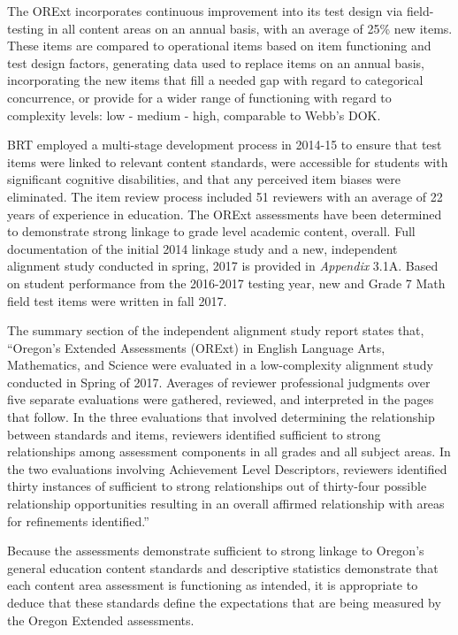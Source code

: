\documentclass[]{article}
\begin{document}
The ORExt incorporates continuous improvement into its test design via
field-testing in all content areas on an annual basis, with an average
of 25\% new items. These items are compared to operational items based
on item functioning and test design factors, generating data used to
replace items on an annual basis, incorporating the new items that fill
a needed gap with regard to categorical concurrence, or provide for a
wider range of functioning with regard to complexity levels: low -
medium - high, comparable to Webb's DOK.

BRT employed a multi-stage development process in 2014-15 to ensure that
test items were linked to relevant content standards, were accessible
for students with significant cognitive disabilities, and that any
perceived item biases were eliminated. The item review process included
51 reviewers with an average of 22 years of experience in education. The
ORExt assessments have been determined to demonstrate strong linkage to
grade level academic content, overall. Full documentation of the initial
2014 linkage study and a new, independent alignment study conducted in
spring, 2017 is provided in \emph{Appendix} 3.1A. Based on student
performance from the 2016-2017 testing year, new and Grade 7 Math field
test items were written in fall 2017.

The summary section of the independent alignment study report states
that, ``Oregon's Extended Assessments (ORExt) in English Language Arts,
Mathematics, and Science were evaluated in a low-complexity alignment
study conducted in Spring of 2017. Averages of reviewer professional
judgments over five separate evaluations were gathered, reviewed, and
interpreted in the pages that follow. In the three evaluations that
involved determining the relationship between standards and items,
reviewers identified sufficient to strong relationships among assessment
components in all grades and all subject areas. In the two evaluations
involving Achievement Level Descriptors, reviewers identified thirty
instances of sufficient to strong relationships out of thirty-four
possible relationship opportunities resulting in an overall affirmed
relationship with areas for refinements identified.''

Because the assessments demonstrate sufficient to strong linkage to
Oregon's general education content standards and descriptive statistics
demonstrate that each content area assessment is functioning as
intended, it is appropriate to deduce that these standards define the
expectations that are being measured by the Oregon Extended assessments.
\end{document}
